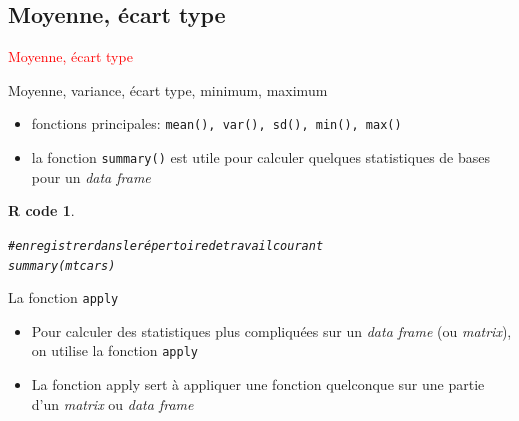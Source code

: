 \documentclass[11pt]{beamer}\usepackage[]{graphicx}\usepackage[]{color}
\makeatletter
\newcommand{\hlcom}[1]{\textcolor[rgb]{0.588,0.588,0.588}{#1}}%
\newcommand{\hlstd}[1]{\textcolor[rgb]{0.196,0.196,0.196}{#1}}%
\newcommand{\hlkwd}[1]{\textcolor[rgb]{0.78,0.227,0.412}{#1}}%
\newenvironment{kframe}{%
 \def\at@end@of@kframe{}%
 \ifinner\ifhmode%
  \def\at@end@of@kframe{\end{minipage}}%
  \begin{minipage}{\columnwidth}%
 \fi\fi%
 \def\FrameCommand##1{\hskip\@totalleftmargin \hskip-\fboxsep
 \colorbox{shadecolor}{##1}\hskip-\fboxsep
     \hskip-\linewidth \hskip-\@totalleftmargin \hskip\columnwidth}%
 \MakeFramed {\advance\hsize-\width
   \@totalleftmargin\z@ \linewidth\hsize
   \@setminipage}}%
 {\par\unskip\endMakeFramed%
 \at@end@of@kframe}
\newenvironment{knitrout}{}{} %
\newtheorem{rcode}{R code}[section]
\newcommand{\code}[1]{\texttt{#1}}
\makeatother
\begin{document}

\subsection{Moyenne, écart type}

\begin{frame}
 \begin{center}
  \Huge{\textcolor{red}{Moyenne, écart type}}
 \end{center}
\end{frame}



\begin{frame}[fragile]{Moyenne, variance, écart type, minimum, maximum}

\begin{itemize}
  \setlength\itemsep{2em}
\item fonctions principales: \code{mean(), var(), sd(), min(), max()}
\item la fonction \code{summary()} est utile pour calculer quelques statistiques de bases pour un \textit{data frame}
\end{itemize}
\pause 
\begin{knitrout}
\color{fgcolor}\begin{kframe}
\begin{rcode}\label{unnamed-chunk-36}\begin{alltt}
\hlcom{# enregistrer dans le répertoire de travail courant}
\hlkwd{summary}\hlstd{(mtcars)}
\end{alltt}
\end{rcode}\end{kframe}
\end{knitrout}
\end{frame}




\begin{frame}[fragile]{La fonction \code{apply}}
\begin{itemize}
  \setlength\itemsep{1em}
\item Pour calculer des statistiques plus compliquées sur un \textit{data frame} (ou \textit{matrix}), on utilise la fonction \code{apply}
\item La fonction apply sert à appliquer une fonction quelconque sur une partie d'un \textit{matrix} ou \textit{data frame}
\end{itemize}


\end{frame}
\end{document}
